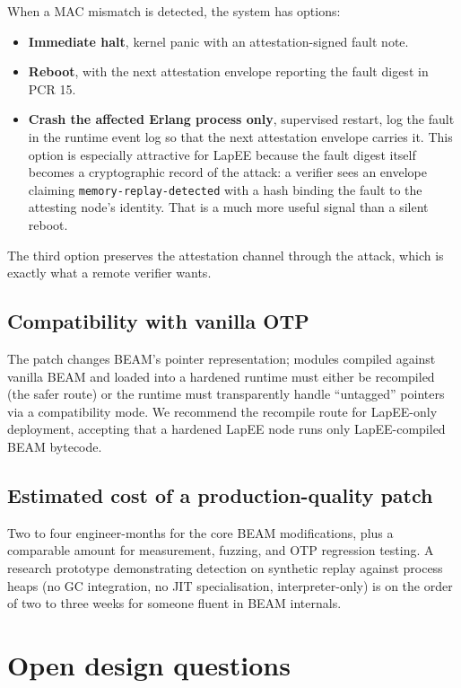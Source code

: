 \documentclass[10pt,a4paper]{article}
\begin{document}
When a MAC mismatch is detected, the system has options:

\begin{itemize}[label=---]
\item \textbf{Immediate halt}, kernel panic with an attestation-signed
fault note.
\item \textbf{Reboot}, with the next attestation envelope reporting the
fault digest in PCR 15.
\item \textbf{Crash the affected Erlang process only}, supervised
restart, log the fault in the runtime event log so that the next
attestation envelope carries it. This option is especially attractive
for LapEE because the fault digest itself becomes a cryptographic
record of the attack: a verifier sees an envelope claiming
\texttt{memory-replay-detected} with a hash binding the fault to the
attesting node's identity. That is a much more useful signal than a
silent reboot.
\end{itemize}

The third option preserves the attestation channel through the attack,
which is exactly what a remote verifier wants.

\subsection{Compatibility with vanilla OTP}

The patch changes BEAM's pointer representation; modules compiled
against vanilla BEAM and loaded into a hardened runtime must either
be recompiled (the safer route) or the runtime must transparently
handle ``untagged'' pointers via a compatibility mode. We recommend
the recompile route for LapEE-only deployment, accepting that a
hardened LapEE node runs only LapEE-compiled BEAM bytecode.

\subsection{Estimated cost of a production-quality patch}

Two to four engineer-months for the core BEAM modifications, plus a
comparable amount for measurement, fuzzing, and OTP regression
testing. A research prototype demonstrating detection on synthetic
replay against process heaps (no GC integration, no JIT
specialisation, interpreter-only) is on the order of two to three
weeks for someone fluent in BEAM internals.

\section{Open design questions}
\end{document}
